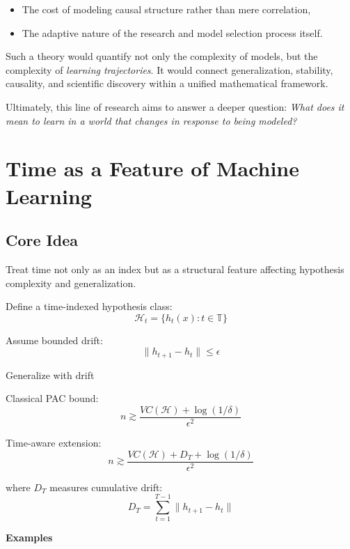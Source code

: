 \begin{itemize}
\begin{itemize}
        \item The cost of modeling causal structure rather than mere correlation,

        \item The adaptive nature of the research and model selection process
          itself.
      \end{itemize}

      Such a theory would quantify not only the complexity of models, but
      the complexity of \emph{learning trajectories}. It would connect generalization,
      stability, causality, and scientific discovery within a unified
      mathematical framework.

      Ultimately, this line of research aims to answer a deeper question:
      \emph{What does it mean to learn in a world that changes in
      response to being modeled?}
  \end{itemize}

  \section{Time as a Feature of Machine Learning}

  \subsection*{Core Idea}

  Treat time not only as an index but as a structural feature affecting hypothesis
  complexity and generalization.

  Define a time-indexed hypothesis class:
  $$
    \mathcal{H}_{t}= \{h_{t}(x) : t \in \mathbb{T}\}
  $$

  Assume bounded drift:
  $$
    \|h_{t+1}- h_{t}\| \le \epsilon
  $$

  Generalize with drift

  Classical PAC bound:
  $$
    n \gtrsim \frac{VC(\mathcal{H}) + \log(1/\delta)}{\epsilon^{2}}
  $$

  Time-aware extension:
  $$
    n \gtrsim \frac{VC(\mathcal{H}) + D_{T}+ \log(1/\delta)}{\epsilon^{2}}
  $$

  where $D_{T}$ measures cumulative drift:
  $$
    D_{T}= \sum_{t=1}^{T-1}\|h_{t+1}- h_{t}\|
  $$

  \textbf{Examples}


